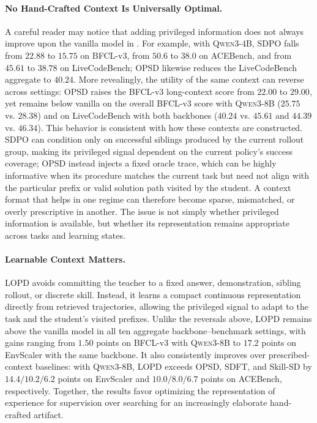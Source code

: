 \documentclass{article} %
\newcommand{\llmname}[1]{\textsc{#1}}
\newcommand{\ourmethod}{{\textsc{LOPD}}\xspace}
\begin{document}
\paragraph{No Hand-Crafted Context Is Universally Optimal.}
A careful reader may notice that adding privileged information does not always improve upon the vanilla model in . For example, with \llmname{Qwen3-4B}, SDPO falls from $22.88$ to $15.75$ on BFCL-v3, from $50.6$ to $38.0$ on ACEBench, and from $45.61$ to $38.78$ on LiveCodeBench; OPSD likewise reduces the LiveCodeBench aggregate to $40.24$. More revealingly, the utility of the same context can reverse across settings: OPSD raises the BFCL-v3 long-context score from $22.00$ to $29.00$, yet remains below vanilla on the overall BFCL-v3 score with \llmname{Qwen3-8B} ($25.75$ vs. $28.38$) and on LiveCodeBench with both backbones ($40.24$ vs. $45.61$ and $44.39$ vs. $46.34$). This behavior is consistent with how these contexts are constructed. SDPO can condition only on successful siblings produced by the current rollout group, making its privileged signal dependent on the current policy's success coverage; OPSD instead injects a fixed oracle trace, which can be highly informative when its procedure matches the current task but need not align with the particular prefix or valid solution path visited by the student. A context format that helps in one regime can therefore become sparse, mismatched, or overly prescriptive in another. The issue is not simply whether privileged information is available, but whether its representation remains appropriate across tasks and learning states.

\vspace{-0.7em}
\paragraph{Learnable Context Matters.}
\ourmethod avoids committing the teacher to a fixed answer, demonstration, sibling rollout, or discrete skill. Instead, it learns a compact continuous representation directly from retrieved trajectories, allowing the privileged signal to adapt to the task and the student's visited prefixes. Unlike the reversals above, \ourmethod remains above the vanilla model in all ten aggregate backbone--benchmark settings, with gains ranging from $1.50$ points on BFCL-v3 with \llmname{Qwen3-8B} to $17.2$ points on EnvScaler with the same backbone. It also consistently improves over prescribed-context baselines: with \llmname{Qwen3-8B}, \ourmethod exceeds OPSD, SDFT, and Skill-SD by $14.4/10.2/6.2$ points on EnvScaler and $10.0/8.0/6.7$ points on ACEBench, respectively. Together, the results favor optimizing the representation of experience for supervision over searching for an increasingly elaborate hand-crafted artifact.
\end{document}
